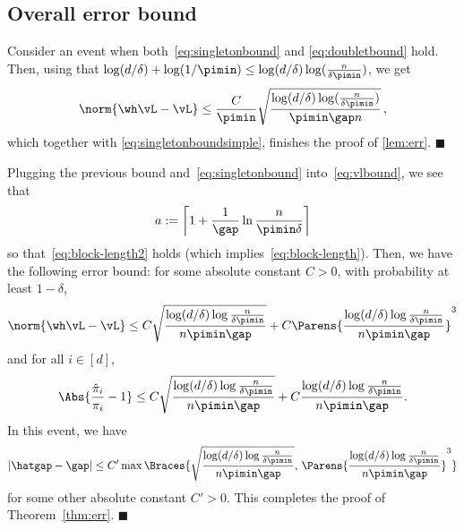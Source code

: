 \subsection{Overall error bound}
Consider an event when both~\eqref{eq:singletonbound} and \eqref{eq:doubletbound} hold.
Then, using that $\log(d/\delta) + \log(1/\pimin) \le \log(d/\delta)\log(\frac{n}{\delta\pimin})$, we get
\begin{align*}
\norm{\wh\vL - \vL} \le 
\frac{C}{\pimin}
\sqrt{
    \frac{\log(d/\delta)\log(\frac{n}{\delta\pimin})}{\pimin\gap n}
  }\,,
\end{align*}
which together with \eqref{eq:singletonboundsimple},
finishes the proof of \cref{lem:err}.
\hfill $\blacksquare$


Plugging the previous bound and~\eqref{eq:singletonbound} into~\eqref{eq:vlbound}, we see that
\[
  a := \left\lceil 1 + \frac{1}{\gap}\ln\frac{n}{\pimin\delta} \right\rceil
\]
so that~\eqref{eq:block-length2} holds (which implies~\eqref{eq:block-length}).
Then, we have the following error bound: for some absolute constant
$C>0$, with probability at least $1-\delta$, 
\begin{equation}
  \norm{\wh\vL - \vL}
  \leq
  C
  \sqrt{\frac{\log(d/\delta)\log\frac{n}{\delta\pimin}}{n\pimin\gap}}
  +
  C
  \Parens{
    \frac{\log(d/\delta)\log\frac{n}{\delta\pimin}}{n\pimin\gap}
  }^3
\end{equation}
and for all $i \in [d]$,
\begin{equation}
  \Abs{ \frac{\hat\pi_i}{\pi_i} - 1 }
  \leq 
  C
  \sqrt{\frac{\log(d/\delta)\log\frac{n}{\delta\pimin}}{n\pimin\gap}}
  +
  C
  \frac{\log(d/\delta)\log\frac{n}{\delta\pimin}}{n\pimin\gap}
  .
\end{equation}
In this event, we have
\begin{equation}
  |\hatgap - \gap|
  \leq
  C'
  \max\Braces{
    \sqrt{\frac{\log(d/\delta)\log\frac{n}{\delta\pimin}}{n\pimin\gap}}
    ,\,
    \Parens{
      \frac{\log(d/\delta)\log\frac{n}{\delta\pimin}}{n\pimin\gap}
    }^3
  }
\end{equation}
for some other absolute constant $C'>0$.
This completes the proof of Theorem~\ref{thm:err}.
\hfill $\blacksquare$
\fi


